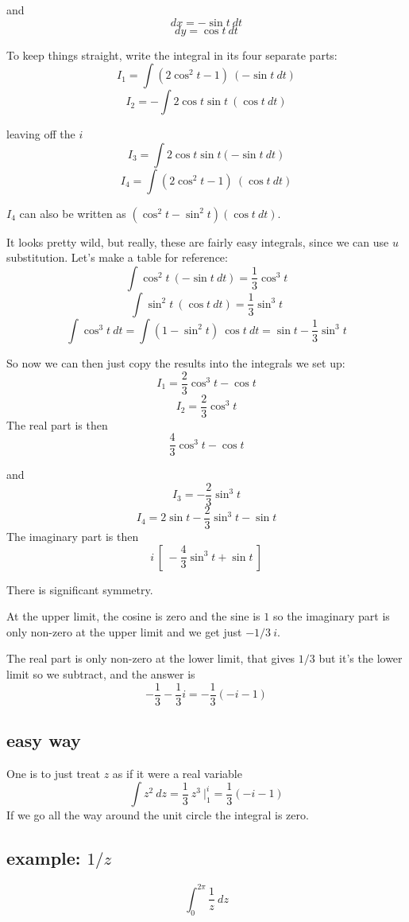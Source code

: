 \documentclass[11pt, oneside]{article}
\begin{document}
and
\[ dx = - \sin t \ dt \]
\[ dy = \cos t \ dt \]

To keep things straight, write the integral in its four separate parts:
\[ I_1 = \int (2 \cos^2 t - 1) \  (- \sin t \ dt) \]
\[ I_2 = - \int 2 \cos t \sin t \ (\cos t \ dt) \]

leaving off the $i$
\[ I_3 = \int 2 \cos t \sin t (- \sin t \ dt) \]
\[ I_4 = \int (2 \cos^2 t - 1) \ (\cos t \ dt) \]

$I_4$ can also be written as $(\cos^2 t - \sin^2 t)(\cos t \ dt)$.

It looks pretty wild, but really, these are fairly easy integrals, since we can use $u$ substitution.  Let's make a table for reference:
\[ \int \cos^2 t \ (- \sin t \ dt) = \frac{1}{3} \cos^3 t \]
\[ \int \sin^2 t \ (\cos t \ dt) = \frac{1}{3} \sin^3 t \]
\[ \int \cos^3 t \ dt = \int (1 - \sin^2 t) \ \cos t \ dt = \sin t - \frac{1}{3} \sin^3 t \]

So now we can then just copy the results into the integrals we set up:
\[ I_1 = \frac{2}{3} \cos^3 t - \cos t \]
\[  I_2 = \frac{2}{3} \cos^3 t \]
The real part is then
\[  \frac{4}{3} \cos^3 t - \cos t \]

and
\[ I_3 = -\frac{2}{3} \sin^3 t \]
\[  I_4  = 2 \sin t - \frac{2}{3} \sin^3 t - \sin t \]
The imaginary part is then
\[ i \ [ \ -\frac{4}{3} \sin^3 t + \sin t \ ] \]

There is significant symmetry.

At the upper limit, the cosine is zero and the sine is $1$ so the imaginary part is only non-zero at the upper limit and we get just $-1/3 \ i$.  

The real part is only non-zero at the lower limit, that gives $1/3$ but it's the lower limit so we subtract, and the answer is
\[ -\frac{1}{3} - \frac{1}{3} i = -\frac{1}{3} (-i - 1) \]

\subsection*{easy way}
One is to just treat $z$ as if it were a real variable
\[ \int z^2 \ dz = \frac{1}{3} \ z^3 \ \bigg |_1^i = \frac{1}{3} (-i - 1) \]
If we go all the way around the unit circle the integral is zero.


\subsection*{example:  $1/z$}
\[ \int_0^{2\pi} \frac{1}{z} \ dz \]
\end{document}
